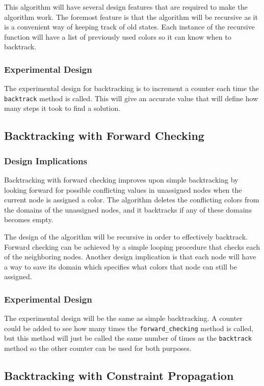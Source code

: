 \documentclass{article}
\begin{document}
\begin{multicols}{2}
This algorithm will have several design features that are required to make the algorithm work. The foremost feature is that the algorithm will be recursive as it is a convenient way of keeping track of old states. Each instance of the recursive function will have a list of previously used colors so it can know when to backtrack. 
\subsubsection{Experimental Design}
The experimental design for backtracking is to increment a counter each time the \texttt{backtrack} method is called. This will give an accurate value that will define how many steps it took to find a solution. 

\subsection{Backtracking with Forward Checking}
\subsubsection{Design Implications}
Backtracking with forward checking improves upon simple backtracking by looking forward for possible conflicting values in unassigned nodes when the current node is assigned a color.  The algorithm deletes the conflicting colors from the domains of the unassigned nodes, and it backtracks if any of these domains becomes empty. \par
The design of the algorithm will be recursive in order to effectively backtrack.  Forward checking can be achieved by a simple looping procedure that checks each of the neighboring nodes. Another design implication is that each node will have a way to save its domain which specifies what colors that node can still be assigned.\par
\subsubsection{Experimental Design}
The experimental design will be the same as simple backtracking. A counter could be added to see how many times the \texttt{forward\_checking}  method is called, but this method will just be called the same number of times as the \texttt{backtrack} method so the other counter can be used for both purposes.

\subsection{Backtracking with Constraint Propagation}

\end{multicols}
\end{document}
